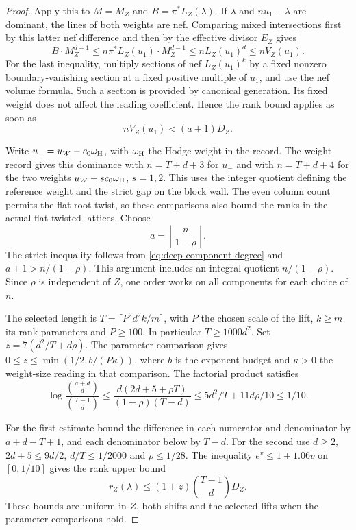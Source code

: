 \begin{proof}
Apply this to \(M=M_Z\) and \(B=\pi^*L_Z(\lambda)\).
If \(\lambda\) and \(n u_1-\lambda\) are dominant, the
lines of both weights are nef. Comparing mixed intersections
first by this latter nef difference and then by the
effective divisor \(E_Z\) gives
\[
 B\cdot M_Z^{d-1}
 \le n\pi^*L_Z(u_1)\cdot M_Z^{d-1}
 \le n L_Z(u_1)^d\le n V_Z(u_1).
\]
For the last inequality, multiply sections of nef
\(L_Z(u_1)^k\) by a fixed nonzero boundary-vanishing
section at a fixed positive multiple of \(u_1\), and
use the nef volume formula. Such a section is provided
by canonical generation. Its fixed weight does not
affect the leading coefficient. Hence the rank bound
applies as soon as
\[
 nV_Z(u_1)<(a+1)D_Z.
\]


Write \(u_-=u_W-c_0\omega_{\rm H}\), with \(\omega_{\rm H}\)
the Hodge weight in the record. The weight record gives
this dominance with \(n=T+d+3\) for \(u_-\) and with
\(n=T+d+4\) for the two weights \(u_W+s c_0\omega_{\rm H}\),
\(s=1,2\). This uses the
integer quotient defining the reference weight and the strict
gap on the block wall. The even column count permits the
flat root twist, so these comparisons also bound the
ranks in the actual flat-twisted lattices.
Choose
\[
 a=\left\lfloor\frac{n}{1-\rho}\right\rfloor .
\]
The strict inequality follows from
\eqref{eq:deep-component-degree} and \(a+1>n/(1-\rho)\).
This argument includes an integral quotient \(n/(1-\rho)\).
Since \(\rho\) is independent of \(Z\), one order works
on all components for each choice of \(n\).

The selected length is \(T=\lceil P^2d^2 k/m\rceil\),
with \(P\) the chosen scale of the lift, \(k\ge m\) its
rank parameters and \(P\ge100\). In particular
\(T\ge1000d^2\). Set \(z=7(d^2/T+d\rho)\). The
parameter comparison gives \(0\le z\le
\min(1/2,b/(P\kappa))\), where \(b\) is the exponent
budget and \(\kappa>0\) the weight-size reading in
that comparison. The factorial product satisfies
\[
 \log\frac{\binom{a+d}{d}}{\binom{T-1}{d}}
 \le \frac{d(2d+5+\rho T)}{(1-\rho)(T-d)}
 \le 5d^2/T+11d\rho/10\le 1/10.
\]

For the first estimate bound the difference in each
numerator and denominator by \(a+d-T+1\), and each
denominator below by \(T-d\). For the second use
\(d\ge2\), \(2d+5\le 9d/2\), \(d/T\le1/2000\)
and \(\rho\le1/28\). The inequality \(e^v\le1+1.06v\)
on \([0,1/10]\) gives the rank upper bound
\begin{equation}
  r_Z(\lambda)\le (1+z)\binom{T-1}{d}D_Z .
  \label{eq:deep-rank-upper}
\end{equation}
These bounds are uniform in \(Z\), both shifts and
the selected lifts when the parameter comparisons hold.

\end{proof}

